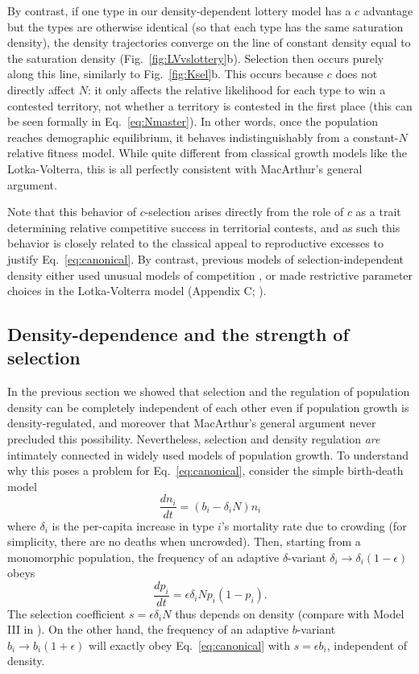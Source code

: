 \documentclass[11pt]{article}
\begin{document}
By contrast, if one type in our density-dependent lottery model has a $c$ advantage but the types are otherwise identical (so that each type has the same saturation density), the density trajectories converge on the line of constant density equal to the saturation density (Fig.~\ref{fig:LVvslottery}b). Selection then occurs purely along this line, similarly to Fig.~\ref{fig:Ksel}b. This occurs because $c$ does not directly affect $N$: it only affects the relative likelihood for each type to win a contested territory, not whether a territory is contested in the first place (this can be seen formally in Eq.~\eqref{eq:Nmaster}). In other words, once the population reaches demographic equilibrium, it behaves indistinguishably from a constant-$N$ relative fitness model. While quite different from classical growth models like the Lotka-Volterra, this is all perfectly consistent with MacArthur's general argument. 

Note that this behavior of $c$-selection arises directly from the role of $c$ as a trait determining relative competitive success in territorial contests, and as such this behavior is closely related to the classical appeal to reproductive excesses to justify Eq.~\eqref{eq:canonical}. By contrast, previous models of selection-independent density either used unusual models of competition \citep{kimura1969natural,nei1971fertility}, or made restrictive parameter choices in the Lotka-Volterra model (Appendix C; \citealt{smouse_1976,mallet_2012}). 

\subsection*{Density-dependence and the strength of selection}

In the previous section we showed that selection and the regulation of population density can be completely independent of each other even if population growth is density-regulated, and moreover that MacArthur's general argument \citep{macarthur_1967} never precluded this possibility. Nevertheless, selection and density regulation \textit{are} intimately connected in widely used models of population growth. To understand why this poses a problem for Eq.~\eqref{eq:canonical}, consider the simple birth-death model \cite[pp. 20]{kostitzin_1939} 
\begin{equation}
\frac{d n_i}{dt}=(b_i -\delta_iN) n_i \label{eq:simplebirthdeath}
\end{equation}
where $\delta_i$ is the per-capita increase in type $i$'s mortality rate due to crowding (for simplicity, there are no deaths when uncrowded). Then, starting from a monomorphic population, the frequency of an adaptive $\delta$-variant $\delta_i\rightarrow \delta_i(1-\epsilon)$ obeys 
\begin{equation}
\frac{d p_i}{dt}=\epsilon \delta_i N p_i(1-p_i). \label{eq:Ndependentsweep}
\end{equation}
The selection coefficient $s=\epsilon \delta_i N$ thus depends on density (compare with Model III in \cite{kimura1969natural}). On the other hand, the frequency of an adaptive $b$-variant $b_i\rightarrow b_i(1+\epsilon)$ will exactly obey Eq.~\eqref{eq:canonical} with $s=\epsilon b_i$, independent of density.
\end{document}
